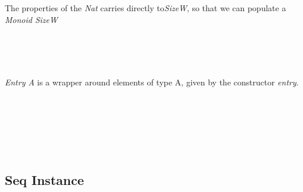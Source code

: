 \documentclass[12pt,twoside,notitlepage]{report}
\begin{document}
The properties of the \textit{Nat} carries directly to\textit{SizeW}, so that we can populate a \textit{Monoid SizeW}

\begin{code}
\\
\>[0]\<[2]%
\>[2]  \AgdaSymbol{:}  \AgdaSymbol{\{}\AgdaSymbol{\}}   \AgdaSymbol{(} \AgdaSymbol{\{}\AgdaSymbol{\})}\<%
\\
\>[0]\<[2]%
\>[2] \AgdaSymbol{=}       \<%
\\
\end{code}

\textit{Entry A} is a wrapper around elements of type A, given by the constructor \textit{entry}.


\begin{code}
\\
\>[0]\<[2]%
\>[2] \AgdaSymbol{:}  \AgdaSymbol{\{}\AgdaSymbol{\}\{} \AgdaSymbol{:}  \AgdaSymbol{\}}  \AgdaSymbol{(} \AgdaSymbol{:}  \AgdaSymbol{)}   \AgdaSymbol{\{}\AgdaSymbol{\}}\<%
\\
\>[0]\<[2]%
\>[2]  \AgdaSymbol{=}  \<%
\\
%
\\
\>[0]\<[2]%
\>[2]  \AgdaSymbol{:} \AgdaSymbol{\}\{} \AgdaSymbol{:}  \AgdaSymbol{\}}   \AgdaSymbol{(} \AgdaSymbol{)} \<%
\\
\>[0]\<[2]%
\>[2] \AgdaSymbol{=}  \<%
\end{code}

\subsection{Seq Instance}
\end{document}

